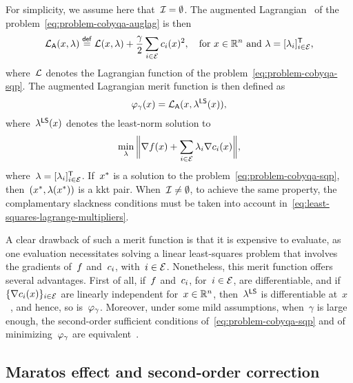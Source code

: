 For simplicity, we assume here that~$\mathcal{I} = \emptyset$.
The augmented Lagrangian~\cite{Hestenes_1969,Powell_1969,Rockafellar_1973} of the problem~\cref{eq:problem-cobyqa-auglag} is then
\begin{equation*}
    \auglag(\iter, \lm) \eqdef \lag(\iter, \lm) + \frac{\gamma}{2} \sum_{i \in \ieq} \con{i}(\iter)^2, \quad \text{for~$\iter \in \R^n$ and~$\lm = [\lm_i]_{i \in \ieq}^{\T}$,}
\end{equation*}
where~$\lag$ denotes the Lagrangian function of the problem~\cref{eq:problem-cobyqa-sqp}.
The augmented Lagrangian merit function is then defined as
\begin{equation*}
    \merit_{\gamma}(\iter) = \auglag(\iter, \lm[\mathsf{LS}](\iter)),
\end{equation*}
where~$\lm[\mathsf{LS}](\iter)$ denotes the least-norm solution to
\begin{equation}
    \label{eq:least-squares-lagrange-multipliers}
    \min_{\lm} \norm[\bigg]{\nabla \obj(\iter) + \sum_{i \in \ieq} \lm_i \nabla \con{i}(x)},
\end{equation}
where~$\lm = [\lm_i]_{i \in \ieq}^{\T}$.
If~$\iter[\ast]$ is a solution to the problem~\cref{eq:problem-cobyqa-sqp}, then~$(\iter[\ast], \lm(\iter[\ast]))$ is a \gls{kkt} pair.
When~$\mathcal{I} \neq \emptyset$, to achieve the same property, the complamentary slackness conditions must be taken into account in~\cref{eq:least-squares-lagrange-multipliers}.

A clear drawback of such a merit function is that it is expensive to evaluate, as one evaluation necessitates solving a linear least-squares problem that involves the gradients of~$f$ and~$c_{i}$, with~$i \in \mathcal{E}$.
Nonetheless, this merit function offers several advantages.
First of all, if~$f$ and~$c_{i}$, for~$i \in \mathcal{E}$, are differentiable, and if~$\set{\nabla \con{i}(\iter)}_{i \in \ieq}$ are linearly independent for~$\iter \in \R^n$, then~$\lm[\mathsf{LS}]$ is differentiable at~$x$~\cite[Lem.~14.2.1]{Conn_Gould_Toint_2000}, and hence, so is~$\merit_{\gamma}$.
Moreover, under some mild assumptions, when~$\gamma$ is large enough, the second-order sufficient conditions of~\cref{eq:problem-cobyqa-sqp} and of minimizing~$\merit_{\gamma}$ are equivalent~\cite[Thm.~14.6.1]{Conn_Gould_Toint_2000}.

\subsection{Maratos effect and second-order correction}

